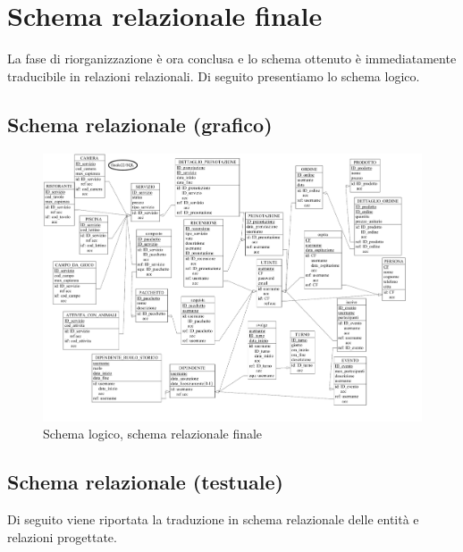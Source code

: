 \documentclass[a4paper,12pt]{report}
\begin{document}
\newpage
\section{Schema relazionale finale}
La fase di riorganizzazione è ora conclusa e lo schema ottenuto è immediatamente traducibile
in relazioni relazionali. Di seguito presentiamo lo schema logico.

\subsection{Schema relazionale (grafico)}
\begin{figure}[H]
	\centering
	\includegraphics[width=\textwidth, trim=0 25pt 25pt 0 , clip]{./pdf/finale logico.pdf}
	\caption{Schema logico, schema relazionale finale}
	\label{fig:schema-logico}
\end{figure}

\subsection{Schema relazionale (testuale)}
Di seguito viene riportata la traduzione in schema relazionale delle entità e relazioni progettate.
\end{document}
